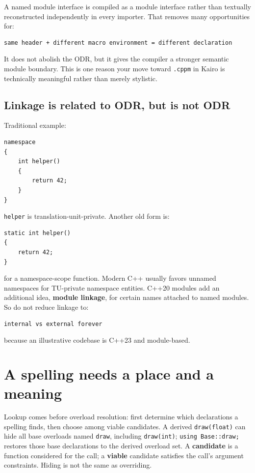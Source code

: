 A named module interface is compiled as a module interface rather than textually reconstructed independently in every importer. That removes many opportunities for:

\begin{verbatim}
same header + different macro environment = different declaration
\end{verbatim}

It does not abolish the ODR, but it gives the compiler a stronger semantic module boundary. This is one reason your move toward \texttt{.cppm} in Kairo is technically meaningful rather than merely stylistic.

\subsection{Linkage is related to ODR, but is not ODR}\label{01-foundations-i-ch002-linkage-is-related-to-odr-but-is-not-odr}

Traditional example:

\begin{verbatim}
namespace
{
    int helper()
    {
        return 42;
    }
}
\end{verbatim}

\texttt{helper} is translation-unit-private. Another old form is:

\begin{verbatim}
static int helper()
{
    return 42;
}
\end{verbatim}

for a namespace-scope function. Modern C++ usually favors unnamed namespaces for TU-private namespace entities. C++20 modules add an additional idea, \textbf{module linkage}, for certain names attached to named modules. So do not reduce linkage to:

\begin{verbatim}
internal vs external forever
\end{verbatim}

because an illustrative codebase is C++23 and module-based.

\section{A spelling needs a place and a meaning}\label{01-foundations-i-ch002-a-spelling-needs-a-place-and-a-meaning}

Lookup comes before overload resolution: first determine which declarations a spelling finds, then choose among viable candidates. A derived \texttt{draw(float)} can hide all base overloads named \texttt{draw}, including \texttt{draw(int)}; \texttt{using\ Base::draw;} restores those base declarations to the derived overload set. A \textbf{candidate} is a function considered for the call; a \textbf{viable} candidate satisfies the call's argument constraints. Hiding is not the same as overriding.

